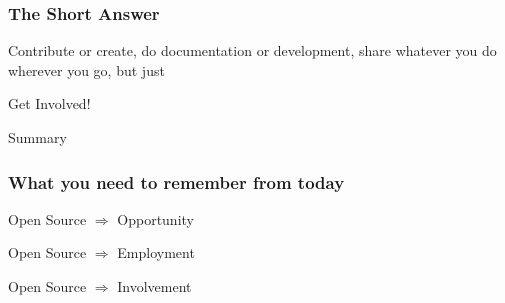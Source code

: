 \documentclass{beamer}
\begin{document}
\begin{frame}
  \frametitle{The Short Answer}
  \begin{center}
    \begin{Large}
      \textcolor{beamer@myblue}{Contribute} or \textcolor{beamer@myblue}{create}, do \textcolor{beamer@mygreen}{documentation} or \textcolor{beamer@mygreen}{development}, \textcolor{beamer@mygrey}{share} whatever you do wherever you go, but just
    \end{Large}

    \vspace{3em}

    \begin{Huge}
      Get Involved!
    \end{Huge}
  \end{center}

\vspace{7em}


\end{frame}

\begin{frame}
  \begin{center}
    \begin{Huge}Summary\end{Huge}
  \end{center}
\end{frame}

\begin{frame}
  \frametitle{What you need to remember from today}
  \begin{center}
    \begin{Huge}
      Open Source $\Rightarrow$ Opportunity

      \vspace{1em}

      Open Source $\Rightarrow$ Employment

      \vspace{1em}
      
      Open Source $\Rightarrow$ Involvement
    \end{Huge}
  \end{center}
\end{frame}

\end{document}
